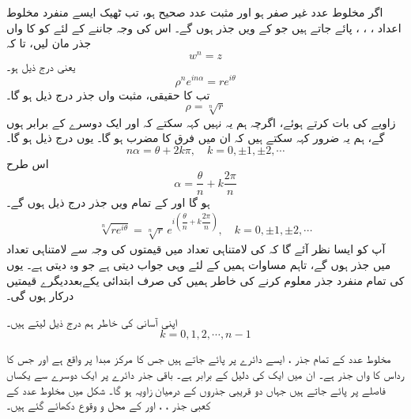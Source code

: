 اگر  مخلوط عدد    غیر صفر ہو اور   مثبت عدد صحیح ہو، تب ٹھیک ایسے   منفرد مخلوط اعداد ، ، ،     پائے جاتے ہیں جو     کے    ویں    جذر  ہوں گے۔ اس کی وجہ جاننے کے لئے  کو  کا   واں جذر مان لیں، تا کہ 
\[w^n=z\]
یعنی  درج ذیل ہو۔
\[\rho^n e^{in\alpha}=re^{i\theta}\]
تب  کا حقیقی، مثبت   واں جذر درج ذیل ہو گا۔
\[\rho=\sqrt[n]{r}\]
زاویے کی بات کرتے ہوئے، اگرچہ ہم یہ نہیں کہہ سکتے کہ  اور   ایک دوسرے کے برابر ہوں گے، ہم یہ ضرور کہہ سکتے ہیں کہ ان میں فرق  کا  مضرب  ہو گا۔ یوں درج ذیل ہو گا۔
\[n\alpha=\theta+2k\pi,\quad k=0,\pm 1,\pm 2,\cdots\]
اس طرح  
\[\alpha=\dfrac{\theta}{n}+k\dfrac{2\pi}{n}\]
ہو گا اور  کے تمام    ویں جذر درج ذیل ہوں گے۔
\begin{align}\label{مساوات_ضمیمہ_مخلوط_تمام_جذر}
\sqrt[n]{re^{i\theta}}=\sqrt[n]{r}\,e^{i(\dfrac{\theta}{n}+k\dfrac{2\pi}{n})},\quad k=0,\pm1,\pm2,\cdots
\end{align}
آپ کو ایسا نظر آئے گا کہ   کی لامتناہی تعداد میں  قیمتوں کی وجہ سے لامتناہی تعداد میں  جذر ہوں گے، تاہم   مساوات   ہمیں  کے لئے وہی جواب دیتی ہے جو وہ   دیتی ہے۔ یوں   کی تمام   منفرد جذر  معلوم کرنے کی خاطر ہمیں    کی صرف ابتدائی   یکےبعددیگرے   قیمتیں درکار ہوں گی۔

اپنی آسانی کی خاطر ہم درج ذیل لیتے ہیں۔
\[k=0,1,2,\cdots,n-1\]

مخلوط عدد  کے تمام      جذر ،  ایسے  دائرے پر پائے جاتے ہیں  جس کا مرکز مبدا پر واقع ہے اور جس کا رداس  کا  واں جذر ہے۔ ان میں ایک کی دلیل  کے برابر ہے۔ باقی جذر  دائرے پر ایک دوسرے سے یکساں فاصلے پر پائے جاتے ہیں جہاں دو قریبی جذروں کے درمیان زاویہ  ہو گا۔ شکل  میں  مخلوط عدد  کے کعبی جذر ، ، اور    کے محل و وقوع  دکھائے گئے ہیں۔

